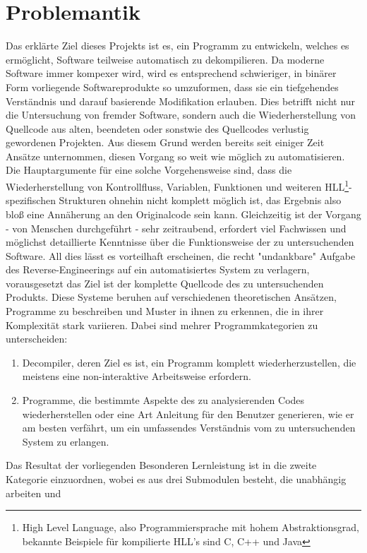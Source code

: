\documentclass[11pt]{article} %
\begin{document}
\section{Problemantik}
Das erklärte Ziel dieses Projekts ist es, ein Programm zu entwickeln, welches
es ermöglicht, Software teilweise automatisch zu dekompilieren. Da moderne Software immer kompexer
wird, wird es entsprechend schwieriger, in binärer Form vorliegende Softwareprodukte so umzuformen,
dass sie ein tiefgehendes Verständnis und darauf basierende Modifikation erlauben.
Dies betrifft nicht nur die Untersuchung von fremder Software, sondern auch die Wiederherstellung
von Quellcode aus alten, beendeten oder sonstwie des Quellcodes verlustig gewordenen Projekten. Aus diesem Grund
werden bereits seit einiger Zeit Ansätze unternommen, diesen Vorgang so weit wie möglich zu automatisieren.
Die Hauptargumente für eine solche Vorgehensweise sind, dass die Wiederherstellung von Kontrollfluss,
Variablen, Funktionen und weiteren HLL\footnote{High Level Language, also Programmiersprache mit hohem
Abstraktionsgrad, bekannte Beispiele für kompilierte HLL's sind C, C++ und Java}-spezifischen Strukturen
ohnehin nicht komplett möglich ist, das Ergebnis also bloß eine Annäherung an den Originalcode sein kann.
Gleichzeitig ist der Vorgang - von Menschen durchgeführt - sehr zeitraubend, erfordert viel
Fachwissen und möglichst detaillierte Kenntnisse über die Funktionsweise der zu untersuchenden Software.
All dies lässt es vorteilhaft erscheinen, die recht "undankbare" Aufgabe des Reverse-Engineerings auf ein
automatisiertes System zu verlagern, vorausgesetzt das Ziel ist der komplette Quellcode des zu
untersuchenden Produkts. Diese Systeme beruhen auf verschiedenen theoretischen Ansätzen,
Programme zu beschreiben und Muster in ihnen zu erkennen, die in ihrer Komplexität stark variieren.
Dabei sind mehrer Programmkategorien zu unterscheiden:
\begin{enumerate}
	\item{Decompiler, deren Ziel es ist, ein Programm
		komplett wiederherzustellen, die meistens eine non-interaktive Arbeitsweise erfordern.}
	\item{Programme, die bestimmte Aspekte des zu analysierenden Codes wiederherstellen oder eine Art
		Anleitung für den Benutzer generieren, wie er am besten verfährt, um ein umfassendes Verständnis
		vom zu untersuchenden System zu erlangen.}
\end{enumerate}
Das Resultat der vorliegenden Besonderen Lernleistung ist in
die zweite Kategorie einzuordnen, wobei es aus drei Submodulen besteht, die unabhängig arbeiten und
\end{document}
